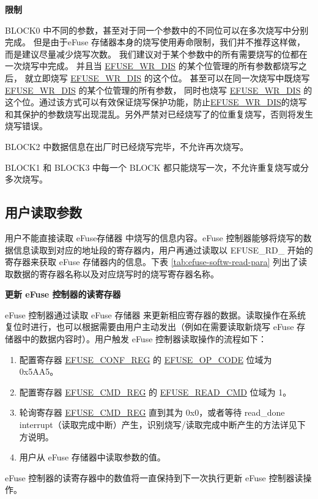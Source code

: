 \documentclass[main\_\_CN.tex]{subfiles}
\begin{document}
{\bfseries 限制}

BLOCK0 中不同的参数，甚至对于同一个参数中的不同位可以在多次烧写中分别完成。
但是由于eFuse 存储器本身的烧写使用寿命限制，我们并不推荐这样做，而是建议尽量减少烧写次数。
我们建议对于某个参数中的所有需要烧写的位都在一次烧写中完成。
并且当 \hyperref[fielddesc:EFUSEWRDIS]{EFUSE\_WR\_DIS} 的某个位管理的所有参数都烧写之后，
就立即烧写 \hyperref[fielddesc:EFUSEWRDIS]{EFUSE\_WR\_DIS} 的这个位。
甚至可以在同一次烧写中既烧写 \hyperref[fielddesc:EFUSEWRDIS]{EFUSE\_WR\_DIS} 的某个位管理的所有参数，
同时也烧写 \hyperref[fielddesc:EFUSEWRDIS]{EFUSE\_WR\_DIS} 的这个位。通过该方式可以有效保证烧写保护功能，防止\hyperref[fielddesc:EFUSEWRDIS]{EFUSE\_WR\_DIS}的烧写和其保护的参数烧写出现混乱。另外严禁对已经烧写了的位重复烧写，否则将发生烧写错误。

BLOCK2 中数据信息在出厂时已经烧写完毕，不允许再次烧写。

BLOCK1 和 BLOCK3 中每一个 BLOCK 都只能烧写一次，不允许重复烧写或分多次烧写。


\subsection{用户读取参数}
\label{sec:efuse-software-read-para}

用户不能直接读取 eFuse存储器 中烧写的信息内容。eFuse 控制器能够将烧写的数据信息读取到对应的地址段的寄存器内，用户再通过读取以 EFUSE\_RD\_ 开始的寄存器来获取 eFuse  存储器内的信息。下表 \ref{tab:efuse-softw-read-para} 列出了读取数据的寄存器名称以及对应烧写时的烧写寄存器名称。




{\bfseries 更新 eFuse 控制器的读寄存器}
\label{sec:efuse-update-reg}

eFuse 控制器通过读取 eFuse 存储器 来更新相应寄存器的数据。读取操作在系统复位时进行，也可以根据需要由用户主动发出（例如在需要读取新烧写 eFuse 存储器中的数据内容时）。用户触发 eFuse 控制器读取操作的流程如下：
\begin{enumerate}
    \item 配置寄存器 \hyperref[regdesc:EFUSECONFREG]{EFUSE\_CONF\_REG} 的 \hyperref[fielddesc:EFUSEOPCODE]{EFUSE\_OP\_CODE} 位域为 0x5AA5。
    \item 配置寄存器 \hyperref[regdesc:EFUSECMDREG]{EFUSE\_CMD\_REG} 的 \hyperref[fielddesc:EFUSEREADCMD]{EFUSE\_READ\_CMD} 位域为 1。
    \item 轮询寄存器 \hyperref[regdesc:EFUSECMDREG]{EFUSE\_CMD\_REG} 直到其为 0x0，或者等待 read\_done interrupt（读取完成中断）产生，识别烧写/读取完成中断产生的方法详见下方说明。
    \item 用户从 eFuse 存储器中读取参数的值。
\end{enumerate}
eFuse 控制器的读寄存器中的数值将一直保持到下一次执行更新 eFuse 控制器读操作。
\end{document}
